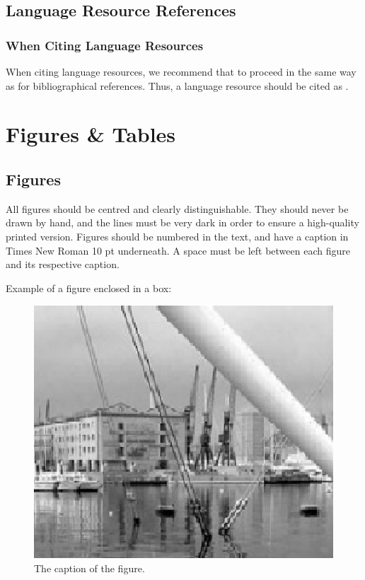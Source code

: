 \documentclass[10pt, a4paper]{article}
\begin{document}
\subsection{Language Resource References}

\subsubsection{When Citing Language Resources}

When citing language resources, we recommend that to proceed in the same way as for bibliographical references.
Thus, a language resource should be cited as .

\section{Figures \& Tables}
\subsection{Figures}

All figures should be centred and clearly distinguishable. They should never be
drawn by hand, and the lines must be very dark in order to ensure a high-quality
printed version. Figures should be numbered in the text, and have a caption in
Times New Roman 10 pt underneath. A space must be left between each figure and
its respective caption. 

Example of a figure enclosed in a box:

\begin{figure}[!h]
\begin{center}
\includegraphics[scale=0.5]{lrec2020W-image1.eps} 
\caption{The caption of the figure.}
\label{fig.1}
\end{center}
\end{figure}
\end{document}
